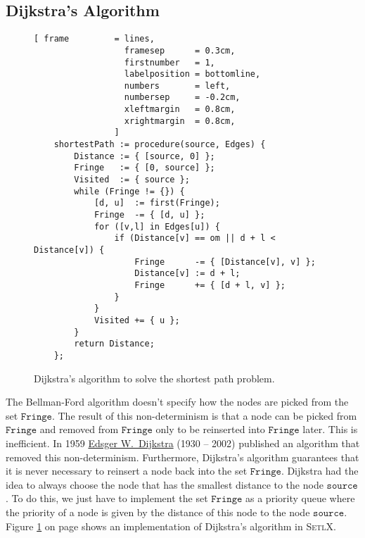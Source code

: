 \subsection{Dijkstra's Algorithm}
\begin{figure}[!ht]
\centering
\begin{Verbatim}[ frame         = lines, 
                  framesep      = 0.3cm, 
                  firstnumber   = 1,
                  labelposition = bottomline,
                  numbers       = left,
                  numbersep     = -0.2cm,
                  xleftmargin   = 0.8cm,
                  xrightmargin  = 0.8cm,
                ]
    shortestPath := procedure(source, Edges) {
        Distance := { [source, 0] };
        Fringe   := { [0, source] };
        Visited  := { source };
        while (Fringe != {}) {
            [d, u]  := first(Fringe);
            Fringe  -= { [d, u] };
            for ([v,l] in Edges[u]) {
                if (Distance[v] == om || d + l < Distance[v]) {
                    Fringe      -= { [Distance[v], v] };
                    Distance[v] := d + l;
                    Fringe      += { [d + l, v] };
                }
            }
            Visited += { u };
        }
        return Distance;
    };
\end{Verbatim}
\vspace*{-0.3cm}
\caption{Dijkstra's algorithm to solve the shortest path problem.}
\label{fig:dijkstra.stlx}
\end{figure}

\noindent
The Bellman-Ford algorithm doesn't specify how the nodes are picked from the set $\texttt{Fringe}$.
The result of this non-determinism is that a node can be picked from $\texttt{Fringe}$ and removed from
$\texttt{Fringe}$ only to be reinserted into $\texttt{Fringe}$ later.  This is inefficient.
In 1959 \href{https://en.wikipedia.org/wiki/Edsger_W._Dijkstra}{Edsger W.~Dijkstra} (1930 -- 2002) \cite{dijkstra:59}
published an algorithm that removed this non-determinism.  Furthermore, Dijkstra's algorithm guarantees that it
is never necessary to reinsert a node back into the set $\texttt{Fringe}$.  Dijkstra had the idea to always choose
the node that has the smallest distance to the node $\texttt{source}$.  To do this, we just have to
implement the set  $\texttt{Fringe}$ as a priority queue where the priority of a node is given by the
distance of this node to the node $\texttt{source}$.  Figure \ref{fig:dijkstra.stlx} on page
\pageref{fig:dijkstra.stlx} shows an implementation of Dijkstra's algorithm in \textsc{SetlX}.


